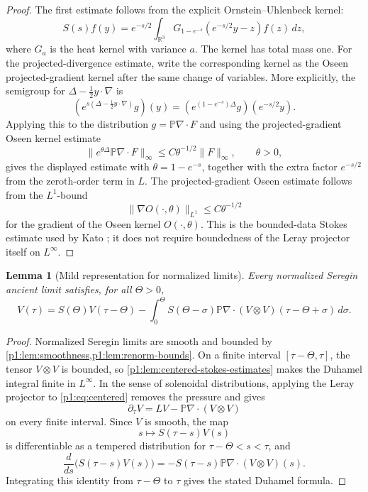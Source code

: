 \documentclass[11pt]{amsart}
\theoremstyle{plain}
\newtheorem{lemma}[lemma]{Lemma}
\theoremstyle{definition}
\theoremstyle{remark}
\numberwithin{equation}{section}
\newcommand{\R}{\mathbb R}
\begin{document}
\begin{proof}
The first estimate follows from the explicit Ornstein--Uhlenbeck kernel:
\[
   S(s)f(y)=e^{-s/2}
   \int_{\R^3}G_{1-e^{-s}}(e^{-s/2}y-z)f(z)\,dz,
\]
where \(G_a\) is the heat kernel with variance \(a\).  The kernel has total
mass one.  For the projected-divergence estimate, write the corresponding
kernel as the Oseen projected-gradient kernel after the same change of
variables.  More explicitly, the semigroup for
\(\Delta-\frac12y\cdot\nabla\) is
\[
   (e^{s(\Delta-\frac12y\cdot\nabla)}g)(y)
   =
   (e^{(1-e^{-s})\Delta}g)(e^{-s/2}y).
\]
Applying this to the distribution \(g=\mathbb P\nabla\cdot F\) and using the
projected-gradient Oseen kernel estimate
\[
   \|e^{\theta\Delta}\mathbb P\nabla\cdot F\|_\infty
   \le C\theta^{-1/2}\|F\|_\infty,\qquad \theta>0,
\]
gives the displayed estimate with \(\theta=1-e^{-s}\), together with the
extra factor \(e^{-s/2}\) from the zeroth-order term in \(L\).  The
projected-gradient Oseen estimate follows from the \(L^1\)-bound
\[
   \|\nabla O(\cdot,\theta)\|_{L^1}\le C\theta^{-1/2}
\]
for the gradient of the Oseen kernel \(O(\cdot,\theta)\).  This is the
bounded-data Stokes estimate used by Kato \cite{Kato1984}; it does not require
boundedness of the Leray projector itself on \(L^\infty\).
\end{proof}

\begin{lemma}[Mild representation for normalized limits]
\label{p1:lem:mild-representation}
Every normalized Seregin ancient limit satisfies, for all \(\Theta>0\),
\[
   V(\tau)
   =
   S(\Theta)V(\tau-\Theta)
   -
   \int_0^\Theta
   S(\Theta-\sigma)\mathbb P\nabla\cdot
   (V\otimes V)(\tau-\Theta+\sigma)\,d\sigma .
\]
\end{lemma}

\begin{proof}
Normalized Seregin limits are smooth and bounded by
\cref{p1:lem:smoothness,p1:lem:renorm-bounds}.  On a finite interval
\([\tau-\Theta,\tau]\), the tensor \(V\otimes V\) is bounded, so
\cref{p1:lem:centered-stokes-estimates} makes the Duhamel integral finite in
\(L^\infty\).  In the sense of solenoidal distributions, applying the Leray
projector to \eqref{p1:eq:centered} removes the pressure and gives
\[
   \partial_\tau V=LV-\mathbb P\nabla\cdot(V\otimes V)
\]
on every finite interval.  Since \(V\) is smooth, the map
\[
   s\mapsto S(\tau-s)V(s)
\]
is differentiable as a tempered distribution for \(\tau-\Theta<s<\tau\), and
\[
   \frac{d}{ds}\bigl(S(\tau-s)V(s)\bigr)
   =
   -S(\tau-s)\mathbb P\nabla\cdot(V\otimes V)(s).
\]
Integrating this identity from \(\tau-\Theta\) to \(\tau\) gives the stated
Duhamel formula.
\end{proof}
\end{document}

